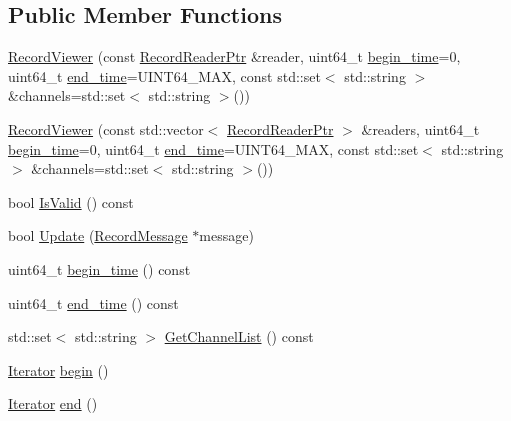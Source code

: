 \subsection*{Public Member Functions}
\begin{DoxyCompactItemize}
\item 
\hyperlink{classapollo_1_1cyber_1_1record_1_1RecordViewer_a56a61361a809d14baf97b63d28ee79f3}{Record\-Viewer} (const \hyperlink{classapollo_1_1cyber_1_1record_1_1RecordViewer_a70f4191b0d79cbc8d8213f1227fd8609}{Record\-Reader\-Ptr} \&reader, uint64\-\_\-t \hyperlink{classapollo_1_1cyber_1_1record_1_1RecordViewer_ae0a5dc3616c012d242360d8c5a10c507}{begin\-\_\-time}=0, uint64\-\_\-t \hyperlink{classapollo_1_1cyber_1_1record_1_1RecordViewer_a59728eb2a8c67691fda06bbf0c246f0c}{end\-\_\-time}=U\-I\-N\-T64\-\_\-\-M\-A\-X, const std\-::set$<$ std\-::string $>$ \&channels=std\-::set$<$ std\-::string $>$())
\item 
\hyperlink{classapollo_1_1cyber_1_1record_1_1RecordViewer_ad66e8c8b234122983a7bd1f956201c20}{Record\-Viewer} (const std\-::vector$<$ \hyperlink{classapollo_1_1cyber_1_1record_1_1RecordViewer_a70f4191b0d79cbc8d8213f1227fd8609}{Record\-Reader\-Ptr} $>$ \&readers, uint64\-\_\-t \hyperlink{classapollo_1_1cyber_1_1record_1_1RecordViewer_ae0a5dc3616c012d242360d8c5a10c507}{begin\-\_\-time}=0, uint64\-\_\-t \hyperlink{classapollo_1_1cyber_1_1record_1_1RecordViewer_a59728eb2a8c67691fda06bbf0c246f0c}{end\-\_\-time}=U\-I\-N\-T64\-\_\-\-M\-A\-X, const std\-::set$<$ std\-::string $>$ \&channels=std\-::set$<$ std\-::string $>$())
\item 
bool \hyperlink{classapollo_1_1cyber_1_1record_1_1RecordViewer_a47a12c3a999368c7fcf4f8bc581d9db2}{Is\-Valid} () const 
\item 
bool \hyperlink{classapollo_1_1cyber_1_1record_1_1RecordViewer_a5542c18bb14c4d9a167ede3951abffd3}{Update} (\hyperlink{structapollo_1_1cyber_1_1record_1_1RecordMessage}{Record\-Message} $\ast$message)
\item 
uint64\-\_\-t \hyperlink{classapollo_1_1cyber_1_1record_1_1RecordViewer_ae0a5dc3616c012d242360d8c5a10c507}{begin\-\_\-time} () const 
\item 
uint64\-\_\-t \hyperlink{classapollo_1_1cyber_1_1record_1_1RecordViewer_a59728eb2a8c67691fda06bbf0c246f0c}{end\-\_\-time} () const 
\item 
std\-::set$<$ std\-::string $>$ \hyperlink{classapollo_1_1cyber_1_1record_1_1RecordViewer_a6e9c6ba317e0d0e0f77a3d7cfdc778f8}{Get\-Channel\-List} () const 
\item 
\hyperlink{classapollo_1_1cyber_1_1record_1_1RecordViewer_1_1Iterator}{Iterator} \hyperlink{classapollo_1_1cyber_1_1record_1_1RecordViewer_a7cd9af47ca08d6b07d9bd78a7f197c8e}{begin} ()
\item 
\hyperlink{classapollo_1_1cyber_1_1record_1_1RecordViewer_1_1Iterator}{Iterator} \hyperlink{classapollo_1_1cyber_1_1record_1_1RecordViewer_a142bc45d0387f9982573aba250d3bebd}{end} ()
\end{DoxyCompactItemize}
